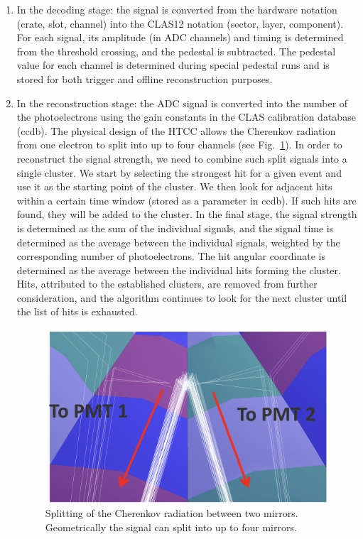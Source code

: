 \begin{enumerate}
\item In the decoding stage: the signal is converted from the hardware notation (crate, slot, channel) into the
  CLAS12 notation (sector, layer, component). For each signal, its amplitude (in ADC channels) and timing is
  determined from the threshold crossing, and the pedestal is subtracted. The pedestal value for each channel
  is determined during special pedestal runs and is stored for both trigger and offline reconstruction purposes.
\item In the reconstruction stage: the ADC signal is converted into the number of the photoelectrons using the
  gain constants in the CLAS calibration database (ccdb). The physical design of the HTCC allows the Cherenkov
  radiation from one electron to split into up to four channels (see Fig.~\ref{fig:htccClustersSplit}). In order to
  reconstruct the signal strength, we need to combine such split signals into a single cluster. We start by selecting
  the strongest hit for a given event and use it as the starting point of the cluster. We then look for adjacent hits
  within a certain time window (stored as a parameter in ccdb). If such hits are found, they will be added to
  the cluster. In the final stage, the signal strength is determined as the sum of the individual signals, and the signal
  time is determined as the average between the individual signals, weighted by the corresponding number of 
  photoelectrons. The hit angular coordinate is determined as the average between the individual hits forming the
  cluster. Hits, attributed to the established clusters, are removed from further consideration, and the algorithm
  continues to look for the next cluster until the list of hits is exhausted.

\begin{figure}[ht]
\centering
\includegraphics[width=0.95\linewidth]{images/htccClustersSplit.png}
\caption{Splitting of the Cherenkov radiation between two mirrors. Geometrically the signal can split into up to four
  mirrors.}
\label{fig:htccClustersSplit}
\end{figure}
\end{enumerate}
